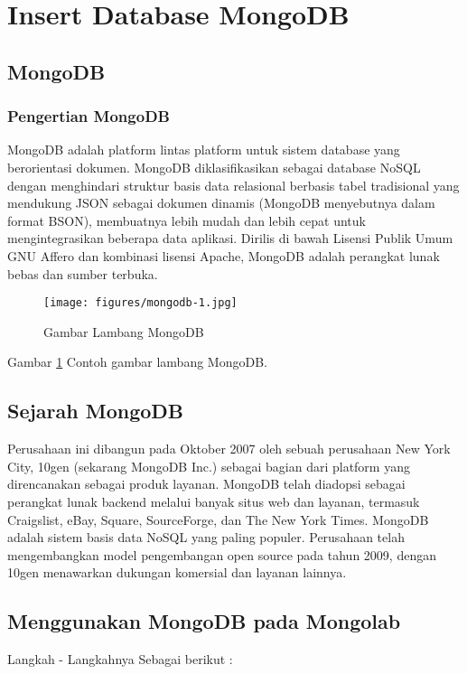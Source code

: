 
\section {Insert Database MongoDB}

\subsection {MongoDB}
\subsubsection {Pengertian MongoDB}
MongoDB adalah platform lintas platform untuk sistem database yang berorientasi  dokumen. 
MongoDB diklasifikasikan sebagai database NoSQL dengan menghindari struktur basis data relasional berbasis tabel tradisional yang mendukung JSON sebagai dokumen dinamis (MongoDB menyebutnya dalam format BSON), membuatnya lebih mudah dan lebih cepat untuk mengintegrasikan beberapa data aplikasi. 
Dirilis di bawah Lisensi Publik Umum GNU Affero dan kombinasi lisensi Apache, MongoDB adalah perangkat lunak bebas dan sumber terbuka.

	\begin{figure}[ht]
	\centerline{\texttt{[image: figures/mongodb-1.jpg]}}
	\caption{Gambar Lambang MongoDB}
	\label{Gambar}
	\end{figure}
      
      Gambar \ref{Gambar} Contoh gambar lambang MongoDB.

\subsection {Sejarah MongoDB}
Perusahaan ini dibangun pada Oktober 2007 oleh sebuah perusahaan New York City, 10gen (sekarang MongoDB Inc.) sebagai bagian dari platform yang direncanakan sebagai produk layanan.
MongoDB telah diadopsi sebagai perangkat lunak backend melalui banyak situs web dan layanan, termasuk Craigslist, eBay, Square, SourceForge, dan The New York Times. MongoDB adalah sistem basis data NoSQL yang paling populer. 
Perusahaan telah mengembangkan model pengembangan open source pada tahun 2009, dengan 10gen menawarkan dukungan komersial dan layanan lainnya.

\subsection {Menggunakan MongoDB pada Mongolab}
Langkah - Langkahnya Sebagai berikut :

